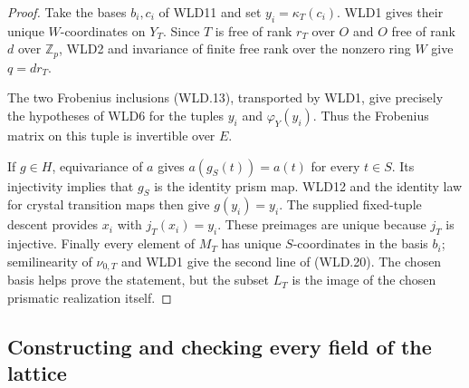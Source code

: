 \begin{proof}
Take the bases $b_i,c_i$ of WLD11 and set
$y_i=\kappa_T(c_i)$. WLD1 gives their unique $W$-coordinates on
$Y_T$. Since $T$ is free of rank $r_T$ over $O$ and $O$ free
of rank $d$ over $\mathbb Z_p$, WLD2 and invariance of finite free
rank over the nonzero ring $W$ give $q=dr_T$.

The two Frobenius inclusions (WLD.13), transported by WLD1,
give precisely the hypotheses of WLD6 for the tuples
$y_i$ and $\varphi_Y(y_i)$. Thus the Frobenius matrix on this
tuple is invertible over $E$.

If $g\in H$, equivariance of $a$ gives $a(g_S(t))=a(t)$
for every $t\in S$. Its injectivity implies that $g_S$ is the
identity prism map. WLD12 and the identity law for crystal
transition maps then give $g(y_i)=y_i$. The supplied fixed-tuple
descent provides $x_i$ with $j_T(x_i)=y_i$. These preimages are
unique because $j_T$ is injective. Finally every element of $M_T$
has unique $S$-coordinates in the basis $b_i$; semilinearity
of $\nu_{0,T}$ and WLD1 give the second line of (WLD.20).
The chosen basis helps prove the statement, but the subset $L_T$
is the image of the chosen prismatic realization itself.
\end{proof}

\subsection{Constructing and checking every field of the lattice}

